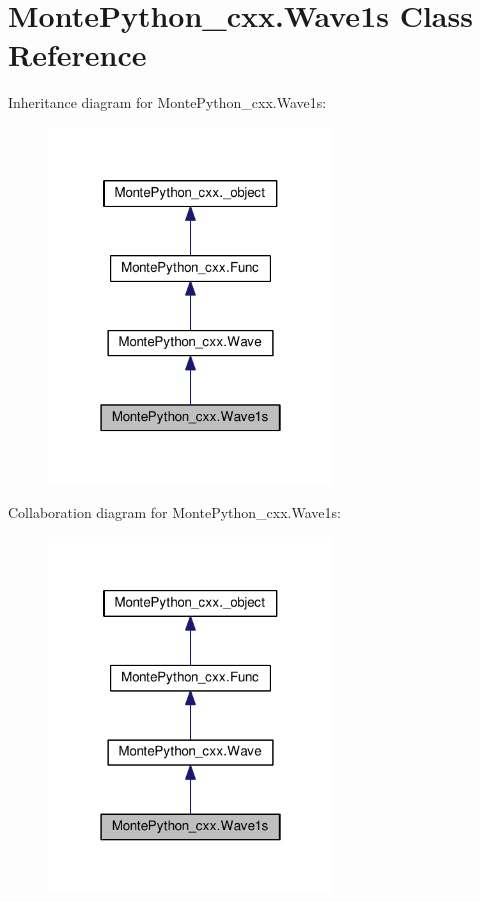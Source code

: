 \hypertarget{classMontePython__cxx_1_1Wave1s}{}\section{Monte\+Python\+\_\+cxx.\+Wave1s Class Reference}
\label{classMontePython__cxx_1_1Wave1s}


Inheritance diagram for Monte\+Python\+\_\+cxx.\+Wave1s\+:
\nopagebreak
\begin{figure}[H]
\begin{center}
\leavevmode
\includegraphics[width=214pt]{classMontePython__cxx_1_1Wave1s__inherit__graph}
\end{center}
\end{figure}


Collaboration diagram for Monte\+Python\+\_\+cxx.\+Wave1s\+:
\nopagebreak
\begin{figure}[H]
\begin{center}
\leavevmode
\includegraphics[width=214pt]{classMontePython__cxx_1_1Wave1s__coll__graph}
\end{center}
\end{figure}
